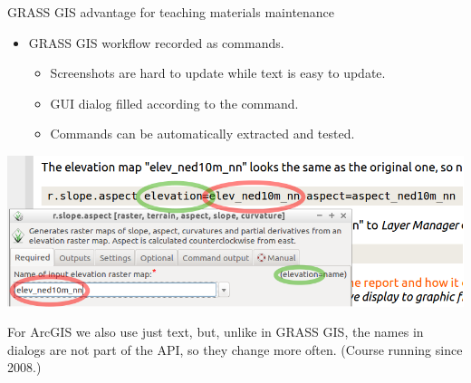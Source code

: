 \documentclass[xcolor={dvipsnames,usenames},beamer,aspectratio=169]{beamer}
\begin{document}
\begin{frame}{GRASS GIS advantage for teaching materials maintenance}

\begin{itemize}
 \item GRASS GIS workflow recorded as commands.
 \begin{itemize}
 \item Screenshots are hard to update while text is easy to update.
 \item GUI dialog filled according to the command.
 \item Commands can be automatically extracted and tested.
 \end{itemize}
\end{itemize}

\begin{center}
\colorbox{gray!20}{
\includegraphics[height=0.5\textheight]{./images/edu/grass_cmd_gui}
}
\end{center}



\scriptsize
For ArcGIS we also use just text, but, unlike in GRASS GIS,
the names in dialogs are not part of the API, so they change more often.
{\tiny(Course running since 2008.)}

\end{frame}
\end{document}
